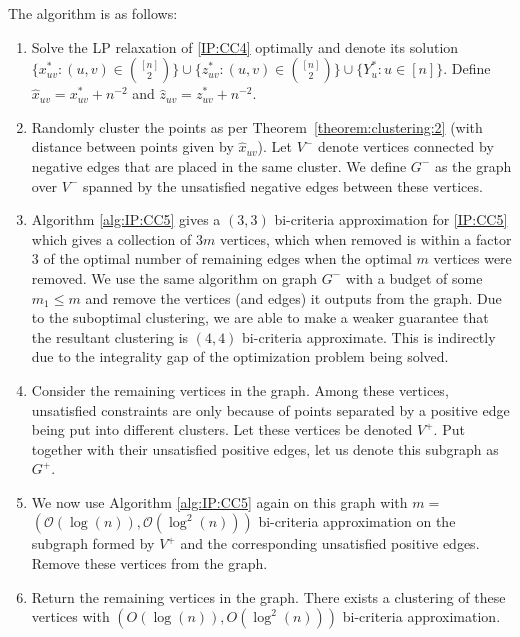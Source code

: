 \begin{proposition}
The algorithm is as follows:
\begin{enumerate}
    \item Solve the LP relaxation of \ref{IP:CC4} optimally and denote its solution $\{ x_{uv}^* : (u,v) \in \binom{[n]}{2} \} \cup \{ z_{uv}^* : (u,v) \in \binom{[n]}{2} \} \cup \{ Y_u^* : u \in [n] \}$. Define $\hat{x}_{uv} = x_{uv}^* + n^{-2}$ and $\hat{z}_{uv} = z_{uv}^* + n^{-2}$.
    \item Randomly cluster the points as per Theorem~\ref{theorem:clustering:2} (with distance between points given by $\hat{x}_{uv}$). Let $V^-$ denote vertices connected by negative edges that are placed in the same cluster. We define $G^-$ as the graph over $V^-$ spanned by the unsatisfied negative edges between these vertices.
    \item Algorithm \ref{alg:IP:CC5} gives a $(3,3)$ bi-criteria approximation for \ref{IP:CC5} which gives a collection of $3m$ vertices, which when removed is within a factor $3$ of the optimal number of remaining edges when the optimal $m$ vertices were removed. We use the same algorithm on graph $G^-$ with a budget of some $m_1 \le m$ and remove the vertices (and edges) it outputs from the graph. Due to the suboptimal clustering, we are able to make a weaker guarantee that the resultant clustering is $(4,4)$ bi-criteria approximate. This is indirectly due to the integrality gap of the optimization problem being solved.
    \item Consider the remaining vertices in the graph. Among these vertices, unsatisfied constraints are only because of points separated by a positive edge being put into different clusters. Let these vertices be denoted $V^+$. Put together with their unsatisfied positive edges, let us denote this subgraph as $G^+$.
    \item We now use Algorithm \ref{alg:IP:CC5} again on this graph with $m = $ $(\mathcal{O}(\log(n)),\mathcal{O}(\log^2(n)))$ bi-criteria approximation on the subgraph formed by $V^+$ and the corresponding unsatisfied positive edges. Remove these vertices from the graph.
    \item Return the remaining vertices in the graph. There exists a clustering of these vertices with $(O(\log(n)),O(\log^2(n)))$ bi-criteria approximation.
\end{enumerate}
\end{proposition}

